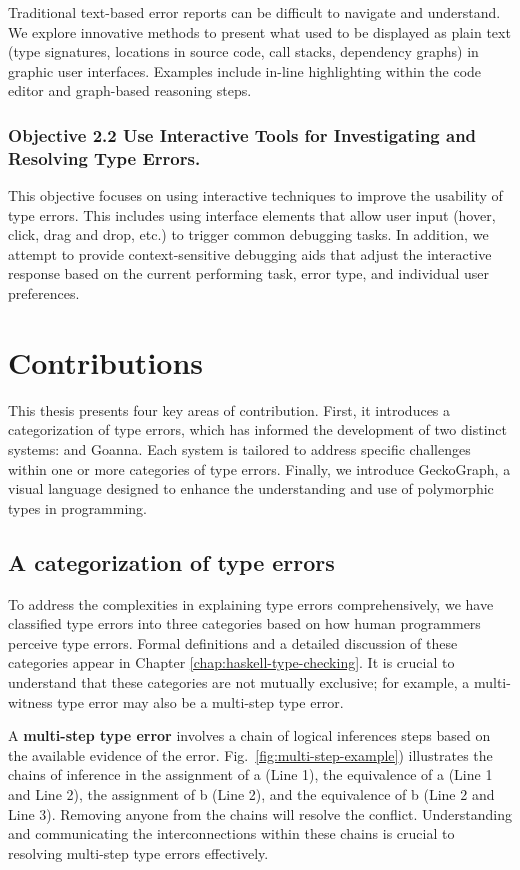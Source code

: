 Traditional text-based error reports can be difficult to navigate and understand. We explore innovative methods to present what used to be displayed as plain text (type signatures, locations in source code, call stacks, dependency graphs) in graphic user interfaces. Examples include in-line highlighting within the code editor and graph-based reasoning steps.  

\subsubsection*{Objective 2.2 Use Interactive Tools for Investigating and Resolving Type Errors.}

This objective focuses on using interactive techniques to improve the usability of type errors.  This includes using interface elements that allow user input (hover, click, drag and drop, etc.) to trigger common debugging tasks. In addition, we attempt to provide context-sensitive debugging aids that adjust the interactive response based on the current performing task, error type, and individual user preferences.


\section{Contributions}

This thesis presents four key areas of contribution. First, it introduces a categorization of type errors, which has informed the development of two distinct systems: \chameleon{} and Goanna. Each system is tailored to address specific challenges within one or more categories of type errors. Finally, we introduce GeckoGraph, a visual language designed to enhance the understanding and use of polymorphic types in programming.

\subsection*{A categorization of type errors}

To address the complexities in explaining type errors comprehensively, we have classified type errors into three categories based on how human programmers perceive type errors. Formal definitions and a detailed discussion of these categories appear in Chapter \ref{chap:haskell-type-checking}. It is crucial to understand that these categories are not mutually exclusive; for example, a multi-witness type error may also be a multi-step type error.

A \textbf{multi-step type error} involves a chain of logical inferences steps based on the available evidence of the error. Fig.~\ref{fig:multi-step-example}) illustrates the chains of inference in the assignment of a (Line 1), the equivalence of a (Line 1 and Line 2), the assignment of b (Line 2), and the equivalence of b (Line 2 and Line 3). Removing anyone from the chains will resolve the conflict. Understanding and communicating the interconnections within these chains is crucial to resolving multi-step type errors effectively.


